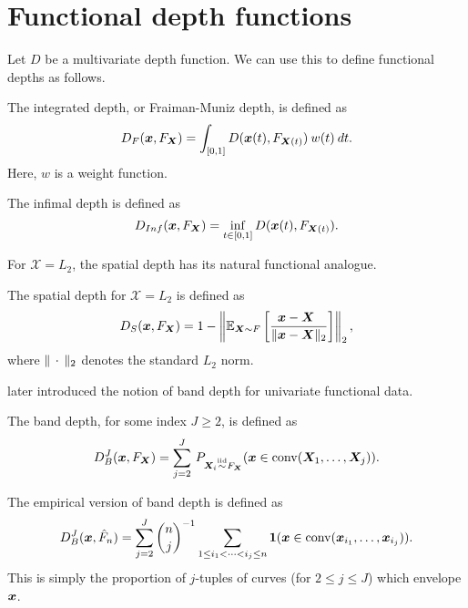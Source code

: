 \section{Functional depth functions}

Let $D$ be a multivariate depth function.
We can use this to define functional depths as follows.

\begin{definition}
    The integrated depth, or Fraiman-Muniz depth, is defined as
    \begin{equation}
        D_F(\bm{x}, F_{\bm{X}}) = \int_{[0, 1]} D(\bm{x}(t), F_{\bm{X}(t)})\:w(t)\:dt.
    \end{equation}
    Here, $w$ is a weight function.
\end{definition}

\begin{definition}
    The infimal depth is defined as
    \begin{equation}
        D_{Inf}(\bm{x}, F_{\bm{X}}) = \inf_{t \in [0, 1]} D(\bm{x}(t), F_{\bm{X}(t)}).
    \end{equation}
\end{definition}


For $\mathscr{X} = L_2$, the spatial depth has its natural functional
analogue.

\begin{definition}
    The spatial depth for $\mathscr{X} = L_2$ is defined as
    \begin{equation}
        D_S(\bm{x}, F_{\bm{X}}) = 1 - \left\Vert \operatorname{\mathbb{E}}_{\bm{X} \sim F} \left[\frac{\bm{x} - \bm{X}\;\,}{\Vert \bm{x} - \bm{X} \Vert_2}\right] \right\Vert_2,
    \end{equation}
    where $\Vert \,\cdot\, \Vert_2$ denotes the standard $L_2$ norm.
\end{definition}


\textcite{pintado-romo-2009} later introduced the notion of band depth for
univariate functional data.

\begin{definition}
    The band depth, for some index $J \geq 2$, is defined as
    \begin{equation}
        D_B^J(\bm{x}, F_{\bm{X}}) = \sum_{j = 2}^J\, P_{\bm{X}_i \overset{\text{iid}}{\sim} F_{\bm{X}}}(\bm{x} \in \operatorname{conv}(\bm{X}_1, \dots, \bm{X}_j)).
    \end{equation}
\end{definition}
The empirical version of band depth is defined as
\begin{equation}
    D_B^J(\bm{x}, \hat{F}_n) = \sum_{j = 2}^J\binom{n}{j}^{-1} \sum_{\substack{1 \leq i_1 < \dots < i_j \leq n}} \bm{1}(\bm{x} \in \operatorname{conv}(\bm{x}_{i_1}, \dots, \bm{x}_{i_j})).
\end{equation}
This is simply the proportion of $j$-tuples of curves (for $2 \leq j \leq J$)
which envelope $\bm{x}$.

